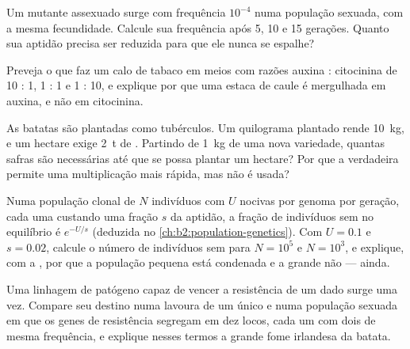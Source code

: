 \begin{exercise}[$\star\star$]\label{exo:b2:asexual-reproduction:7}
Um mutante assexuado surge com frequência $10^{-4}$ numa população
sexuada, com a mesma fecundidade. Calcule sua frequência após 5, 10 e
15 gerações. Quanto sua aptidão precisa ser reduzida para que ele nunca
se espalhe?
\end{exercise}

\begin{exercise}[$\star\star$]\label{exo:b2:asexual-reproduction:8}
Preveja o que faz um calo de tabaco em meios com razões auxina :
citocinina de 10 : 1, 1 : 1 e 1 : 10, e explique por que uma estaca de
caule é mergulhada em auxina, e não em citocinina.
\end{exercise}

\begin{exercise}[$\star\star$]\label{exo:b2:asexual-reproduction:9}
As batatas são plantadas como tubérculos. Um quilograma plantado rende
\qty{10}{kg}, e um hectare exige \qty{2}{t} de .
Partindo de \qty{1}{kg} de uma nova variedade, quantas safras são
necessárias até que se possa plantar um hectare? Por que a 
verdadeira permite uma multiplicação mais rápida, mas não é usada?
\end{exercise}

\begin{exercise}[$\star\star\star$]\label{exo:b2:asexual-reproduction:10}
Numa população clonal de $N$ indivíduos com $U$  nocivas por
genoma por geração, cada uma custando uma fração $s$ da aptidão, a
fração de indivíduos sem  no equilíbrio é
$e^{-U/s}$ (deduzida no \cref{ch:b2:population-genetics}). Com $U =
0.1$ e $s = 0.02$, calcule o número de indivíduos sem  para
$N = 10^{5}$ e $N = 10^{3}$, e explique, com a , por
que a população pequena está condenada e a grande não --- ainda.
\end{exercise}

\begin{exercise}[$\star\star\star$]\label{exo:b2:asexual-reproduction:11}
Uma linhagem de patógeno capaz de vencer a resistência de um dado
 surge uma vez. Compare seu destino numa lavoura de um único
 e numa população sexuada em que os genes de resistência segregam
em dez locos, cada um com dois  de mesma frequência, e explique
nesses termos a grande fome irlandesa da batata.
\end{exercise}

